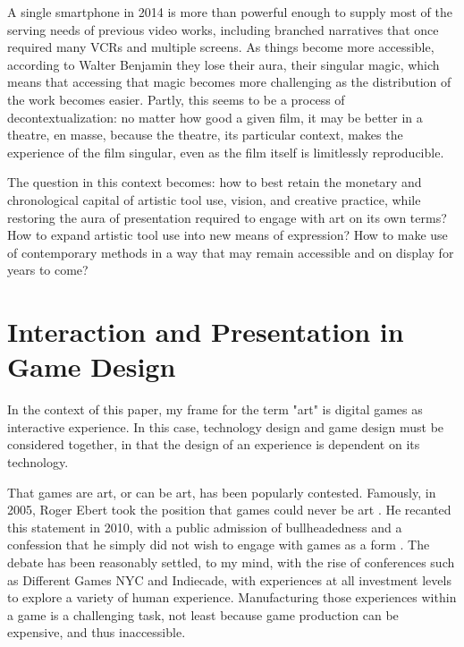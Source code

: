 A single smartphone in 2014 is more than powerful enough to supply most of the serving needs of previous video works, including branched narratives that once required many VCRs and multiple screens. As things become more accessible, according to Walter Benjamin \parencite{benjamin} they lose their aura, their singular magic, which means that accessing that magic becomes more challenging as the distribution of the work becomes easier. Partly, this seems to be a process of decontextualization: no matter how good a given film, it may be better in a theatre, en masse, because the theatre, its particular context, makes the experience of the film singular, even as the film itself is limitlessly reproducible.

The question in this context becomes: how to best retain the monetary and chronological capital of artistic tool use, vision, and creative practice, while restoring the aura of presentation required to engage with art on its own terms? How to expand artistic tool use into new means of expression? How to make use of contemporary methods in a way that may remain accessible and on display for years to come?
 
\section{Interaction and Presentation in Game Design}
In the context of this paper, my frame for the term "art" is digital games as interactive experience. In this case, technology design and game design must be considered together, in that the design of an experience is dependent on its technology.

That games are art, or can be art, has been popularly contested. Famously, in 2005, Roger Ebert took the position that games could never be art \parencite{ebert1}. He recanted this statement in 2010, with a public admission of bullheadedness and a confession that he simply did not wish to engage with games as a form \parencite{ebert2}. The debate has been reasonably settled, to my mind, with the rise of conferences such as Different Games NYC and Indiecade, with experiences at all investment levels to explore a variety of human experience. Manufacturing those experiences within a game is a challenging task, not least because game production can be expensive, and thus inaccessible. 

